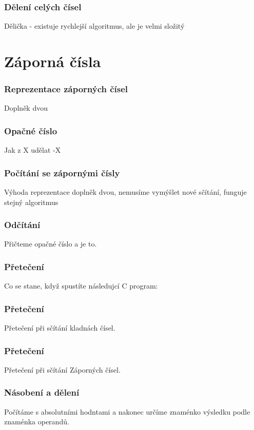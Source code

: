 \documentclass{beamer}
\begin{document}
\begin{frame}
\frametitle{Dělení celých čísel}

Dělička - existuje rychlejší algoritmus, ale je velmi složitý

\end{frame}


\section{Záporná čísla}
\begin{frame}
\frametitle{Reprezentace záporných čísel}
Doplněk dvou

\end{frame}

\begin{frame}
\frametitle{Opačné číslo}

Jak z X udělat -X

\end{frame}


\begin{frame}
\frametitle{Počítání se zápornými čísly}

Výhoda reprezentace doplněk dvou, nemusíme vymýšlet nové sčítání, funguje stejný algoritmus
\end{frame}

\begin{frame}
\frametitle{Odčítání}

Přičteme opačné číslo a je to.
\end{frame}

\begin{frame}
\frametitle{Přetečení}

Co se stane, když spustíte následujcí C program:

\end{frame}

\begin{frame}
\frametitle{Přetečení}

Přetečení při sčítání kladnách čísel.
\end{frame}

\begin{frame}
\frametitle{Přetečení}

Přetečení při sčítání Záporných čísel.
\end{frame}

\begin{frame}
\frametitle{Násobení a dělení}

Počítáme s absolutními hodntami a nakonec určíme znaménko výsledku podle znaménka operandů.
\end{frame}
\end{document}
